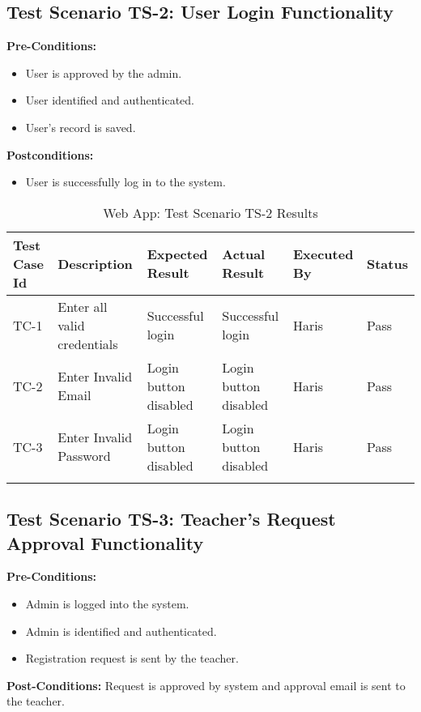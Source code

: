 \subsection{Test Scenario TS-2: User Login Functionality}

\textbf{Pre-Conditions: } 
\begin{itemize}

\item User is approved by the admin.
\item User identified and authenticated.
\item User's record is saved.

\end{itemize}

\textbf{Postconditions:}
\begin{itemize}

\item User is successfully log in to the system.

\end{itemize}

\bigskip

\begin{longtable}{|p{1cm}|p{3cm}|p{2cm}|p{2cm}|p{2cm}|p{2cm}|}
\hline
\textbf{Test Case Id} & \textbf{Description} & \textbf{Expected Result} & \textbf{Actual Result} & \textbf{Executed By} & \textbf{Status}\\
\hline
TC-1 &
Enter all valid credentials &
Successful login &
Successful login &
Haris &
Pass \\
\hline


TC-2 &
Enter Invalid Email &
Login button disabled &
Login button disabled &
Haris &
Pass \\
\hline

TC-3 &
Enter Invalid Password &
Login button disabled &
Login button disabled &
Haris &
Pass \\
\hline




\caption{Web App: Test Scenario TS-2 Results}
\end{longtable}



\subsection{Test Scenario TS-3: Teacher's Request Approval Functionality}

\textbf{Pre-Conditions: }
\begin{itemize}

\item Admin is logged into the system.
\item Admin is identified and authenticated.
\item Registration request is sent by the teacher.

\end{itemize}
\textbf{Post-Conditions: } Request is approved by system and approval email is sent to the teacher.

